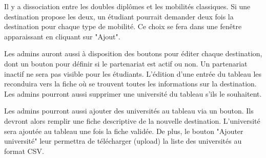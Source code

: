   Il y a dissociation entre les doubles diplômes et les mobilités classiques. Si une destination propose les deux, un étudiant pourrait demander deux fois la destination pour chaque type de mobilité. Ce choix se fera dans une fenêtre apparaissant en cliquant sur "Ajout". 
 
 Les admins auront aussi à disposition des boutons pour éditer chaque destination, dont un bouton pour définir si le partenariat est actif ou non. Un partenariat inactif ne sera pas visible pour les étudiants.
 L'édition d'une entrée du tableau les reconduira vers la fiche où se trouvent toutes les informations sur la destination.
 Les admins pourront aussi supprimer une université du tableau s'ils le souhaitent.
 
 Les admins pourront aussi ajouter des universités au tableau via un bouton. Ils devront alors remplir une fiche descriptive de la nouvelle destination. L'université sera ajoutée au tableau une fois la fiche validée. De plus, le bouton "Ajouter université" leur permettra de télécharger (upload) la liste des universités au format CSV.
 

